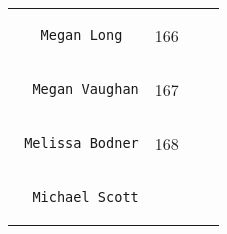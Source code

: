 \documentclass[]{article}
\begin{document}
\begin{longtable}[c]{@{}llll@{}}
\begin{minipage}[t]{0.39\columnwidth}\raggedright
\begin{verbatim}
   Megan Long
\end{verbatim}
\end{minipage} & \begin{minipage}[t]{0.10\columnwidth}\raggedright
166
\end{minipage} & \begin{minipage}[t]{0.13\columnwidth}\raggedright
\end{minipage} & \begin{minipage}[t]{0.15\columnwidth}\raggedright
\end{minipage}
\\\noalign{\medskip}
\begin{minipage}[t]{0.39\columnwidth}\raggedright
\begin{verbatim}
  Megan Vaughan
\end{verbatim}
\end{minipage} & \begin{minipage}[t]{0.10\columnwidth}\raggedright
167
\end{minipage} & \begin{minipage}[t]{0.13\columnwidth}\raggedright
\end{minipage} & \begin{minipage}[t]{0.15\columnwidth}\raggedright
\end{minipage}
\\\noalign{\medskip}
\begin{minipage}[t]{0.39\columnwidth}\raggedright
\begin{verbatim}
 Melissa Bodner
\end{verbatim}
\end{minipage} & \begin{minipage}[t]{0.10\columnwidth}\raggedright
168
\end{minipage} & \begin{minipage}[t]{0.13\columnwidth}\raggedright
\end{minipage} & \begin{minipage}[t]{0.15\columnwidth}\raggedright
\end{minipage}
\\\noalign{\medskip}
\begin{minipage}[t]{0.39\columnwidth}\raggedright
\begin{verbatim}
  Michael Scott
\end{verbatim}
\end{minipage} & \begin{minipage}[t]{0.10\columnwidth}\raggedright

\end{minipage}
\end{longtable}
\end{document}
